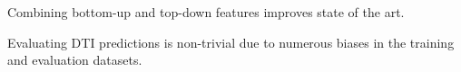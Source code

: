 \documentclass{bioinfo}
\begin{document}
Combining bottom-up and top-down features improves state of the art.

Evaluating DTI predictions is non-trivial due to numerous biases in
the training and evaluation datasets.




	
	

	
\end{document}
